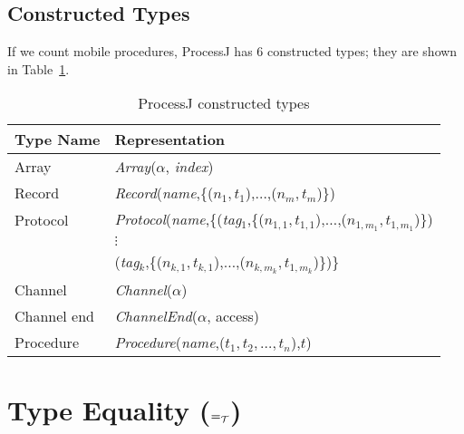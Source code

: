 \documentclass[]{article}
\begin{document}
\subsection{Constructed Types}
If we count mobile procedures, ProcessJ has 6 constructed types; they are shown in Table~\ref{tab:constructedTypes}.
\begin{table}[!h]
  \begin{center}
    \caption{ProcessJ constructed types}
    \label{tab:constructedTypes} 
    \begin{tabular}{|l|l|}\hline
      Type Name & Representation \\ \hline\hline
      Array    & {\it Array}($\alpha$, {\it index})\\
      Record   & {\it Record}({\it name},\{($n_1,t_1$),$\ldots$,($n_m,t_m$)\})\\
      Protocol & {\it Protocol}({\it name},\{({\it tag}$_1$,\{($n_{1,1},t_{1,1}$),$\ldots$,($n_{1,m_1},t_{1,m_1}$)\})\\
               & \hspace*{2.6cm}$\vdots$\\
      & \hspace*{2.475cm}({\it tag}$_k$,\{($n_{k,1},t_{k,1}$),$\ldots$,($n_{k,m_k},t_{1,m_k}$)\})\}\\
      Channel  & {\it Channel}($\alpha$)\\
      Channel end & {\it ChannelEnd}($\alpha$, access)\\ 
      Procedure & {\it Procedure}({\it name},($t_1,t_2,\ldots,t_n$),$t$)\\\hline
    \end{tabular}
  \end{center}
\end{table}

\newcommand{\teq}{=_{\cal T}}

\section{Type Equality ($\teq$)}
\end{document}
